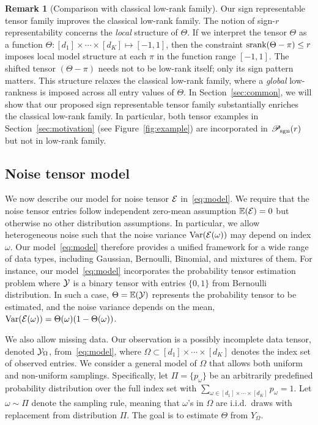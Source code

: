 \documentclass[twoside,11pt]{article}
\theoremstyle{definition}
\newtheorem{rmk}{Remark}
\def\srank{\textup{srank}}
\def\caliP{\mathscr{P}_{\textup{sgn}}}
\begin{document}
\begin{rmk}[Comparison with classical low-rank family] Our sign representable tensor family improves the classical low-rank family. The notion of sign-$r$ representability concerns the \emph{local} structure of $\Theta$. If we interpret the tensor $\Theta$ as a function $\Theta: [d_1]\times \cdots \times [d_K]\mapsto [-1,1]$, then the constraint $\srank(\Theta-\pi)\leq r$ imposes local model structure at each $\pi$ in the function range $[-1,1]$. The shifted tensor $(\Theta-\pi)$ needs not to be low-rank itself; only its sign pattern matters. This structure relaxes the classical low-rank family, where a \emph{global} low-rankness is imposed across all entry values of $\Theta$. In Section~\ref{sec:common}, we will show that our proposed sign representable tensor family substantially enriches the classical low-rank family. In particular, both tensor examples in Section~\ref{sec:motivation} (see Figure~\ref{fig:example}) are incorporated in $\caliP(r)$ but not in low-rank family. 
\end{rmk}


\subsection{Noise tensor model}
We now describe our model for noise tensor $\mathcal{E}$ in~\eqref{eq:model}. We require that the noise tensor entries follow independent zero-mean assumption $\mathbb{E}(\mathcal{E})=0$ but otherwise no other distribution assumptions. In particular, we allow heterogeneous noise such that the noise variance $\text{Var}(\mathcal{E}(\omega))$ may depend on index $\omega$. Our model~\eqref{eq:model} therefore provides a unified framework for a wide range of data types, including Gaussian, Bernoulli, Binomial, and mixtures of them. For instance, our model~\eqref{eq:model} incorporates the probability tensor estimation problem where $\mathcal{Y}$ is a binary tensor with entries $\{0, 1\}$ from Bernoulli distribution. In such a case, $\Theta=\mathbb{E}(\mathcal{Y})$ represents the probability tensor to be estimated, and the noise variance depends on the mean, $\text{Var}(\mathcal{E}(\omega))=\Theta(\omega)(1-\Theta(\omega))$. 

We also allow missing data. Our observation is a possibly incomplete data tensor, denoted  $\mathcal{Y}_\Omega$, from~\eqref{eq:model}, where $\Omega\subset[d_1]\times\cdots\times[d_K]$ denotes the index set of observed entries. We consider a general model of $\Omega$ that allows both uniform and non-uniform samplings. Specifically, let $\Pi=\{p_\omega\}$ be an arbitrarily predefined probability distribution over the full index set with $\sum_{\omega\in[d_1]\times \cdots \times [d_K]}p_\omega=1$. Let $\omega\sim \Pi$ denote the sampling rule, meaning that $\omega$'s in $\Omega$ are i.i.d.\ draws with replacement from distribution $\Pi$. The goal is to estimate $\Theta$ from $Y_{\Omega}$. 
\end{document}
